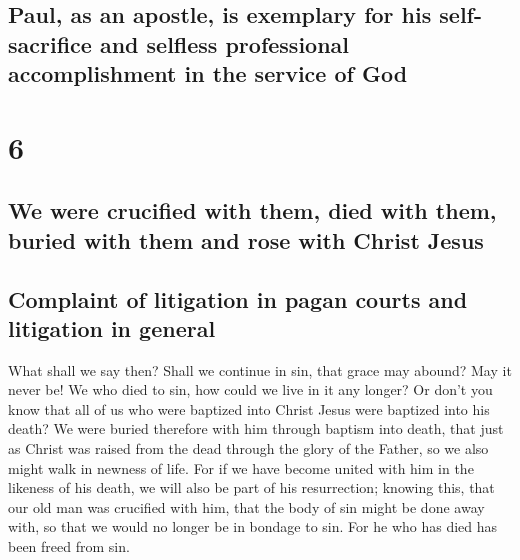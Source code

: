\hypertarget{paul-as-an-apostle-is-exemplary-for-his-self-sacrifice-and-selfless-professional-accomplishment-in-the-service-of-god}{%
\subsection{Paul, as an apostle, is exemplary for his self-sacrifice and
selfless professional accomplishment in the service of
God}\label{paul-as-an-apostle-is-exemplary-for-his-self-sacrifice-and-selfless-professional-accomplishment-in-the-service-of-god}}

\hypertarget{section-5}{%
\section{6}\label{section-5}}

\hypertarget{we-were-crucified-with-them-died-with-them-buried-with-them-and-rose-with-christ-jesus}{%
\subsection{We were crucified with them, died with them, buried with
them and rose with Christ
Jesus}\label{we-were-crucified-with-them-died-with-them-buried-with-them-and-rose-with-christ-jesus}}

\hypertarget{complaint-of-litigation-in-pagan-courts-and-litigation-in-general}{%
\subsection{Complaint of litigation in pagan courts and litigation in
general}\label{complaint-of-litigation-in-pagan-courts-and-litigation-in-general}}

 What shall we say then? Shall we continue in sin, that
grace may abound?  May it never be! We who died to sin,
how could we live in it any longer?  Or don't you know
that all of us who were baptized into Christ Jesus were baptized into
his death?  We were buried therefore with him through
baptism into death, that just as Christ was raised from the dead through
the glory of the Father, so we also might walk in newness of life.
 For if we have become united with him in the likeness of
his death, we will also be part of his resurrection; 
knowing this, that our old man was crucified with him, that the body of
sin might be done away with, so that we would no longer be in bondage to
sin.  For he who has died has been freed from sin.

